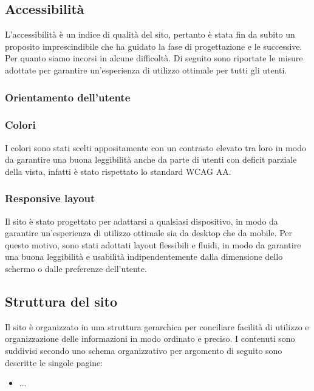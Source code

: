 
\subsection{Accessibilità}

L'accessibilità è un indice di qualità del sito, pertanto è stata fin da subito
un proposito imprescindibile che ha guidato la fase di progettazione e le
successive. Per quanto siamo incorsi in alcune difficoltà. Di seguito sono
riportate le misure adottate per garantire un'esperienza di utilizzo ottimale
per tutti gli utenti.

\subsubsection{Orientamento dell'utente}

\subsubsection{Colori}

I colori sono stati scelti appositamente con un contrasto elevato tra loro in
modo da garantire una buona leggibilità anche da parte di utenti con deficit
parziale della vista, infatti è stato rispettato lo standard WCAG AA.

\subsubsection{Responsive layout}

Il sito è stato progettato per adattarsi a qualsiasi dispositivo, in modo da
garantire un'esperienza di utilizzo ottimale sia da desktop che da mobile. Per
questo motivo, sono stati adottati layout flessibili e fluidi, in modo da
garantire una buona leggibilità e usabilità indipendentemente dalla dimensione
dello schermo o dalle preferenze dell'utente.

\subsection{Struttura del sito}

Il sito è organizzato in una struttura gerarchica per conciliare facilità di
utilizzo e organizzazione delle informazioni in modo ordinato e preciso. I
contenuti sono suddivisi secondo uno schema organizzativo per argomento di
seguito sono descritte le singole pagine:

\begin{itemize}
    \item ...
\end{itemize}

